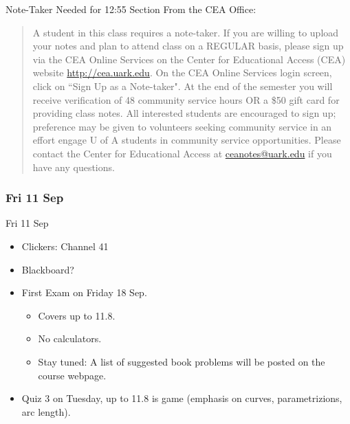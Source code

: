\documentclass[12pt]{beamer}
\theoremstyle{plain}
\theoremstyle{definition}
\begin{document}
\begin{frame}{\small Note-Taker Needed for 12:55 Section}\footnotesize
From the CEA Office:

\begin{quotation}%
A student in this class requires a note-taker. If you are willing to upload your notes and plan to attend class on a REGULAR basis, please sign up via the CEA Online Services on the Center for Educational Access (CEA) website \url{http://cea.uark.edu}. On the CEA Online Services login screen, click on ``Sign Up as a Note-taker". 
%
At the end of the semester you will receive verification of 48 community service hours OR a \$50 gift card for providing class notes. All interested students are encouraged to sign up; preference may be given to volunteers seeking community service in an effort engage U of A students in community service opportunities. 
%
Please contact the Center for Educational Access at \url{ceanotes@uark.edu} if you have any questions.
\end{quotation}
\end{frame}

\subsubsection{Fri 11 Sep}
\begin{frame}{Fri 11 Sep}
\begin{itemize}
\item Clickers: Channel 41
\item Blackboard?
\item First Exam on Friday 18 Sep.  
	\begin{itemize}
	\item Covers up to 11.8.  
	\item No calculators.
	\item Stay tuned: A list of suggested book problems will be posted on the course webpage.
	\end{itemize}
\item Quiz 3 on Tuesday, up to 11.8 is game (emphasis on curves, parametrizions, arc length).
\end{itemize}
\end{frame}
\end{document}
